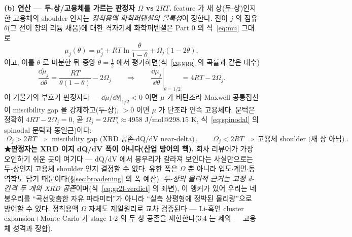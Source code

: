 \textbf{(b) 연산 --- 두-상/고용체를 가르는 판정자 $\Omega$ vs $2RT$.} feature 가 새 상(두-상)인지 한 고용체의
shoulder 인지는 \emph{정칙용액 화학퍼텐셜의 볼록성}이 정한다. 전이 $j$ 의 점유 $\theta$(그 전이 창의 리튬 채움)에
대한 격자기체 화학퍼텐셜은 Part 0 의 식~\eqref{eq:mu} 그대로
\begin{equation}
\mu_j(\theta)=\mu_j^{\circ}+RT\ln\frac{\theta}{1-\theta}+\Omega_j(1-2\theta),
\label{eq:gr2l-mu}
\end{equation}
이고, 이를 $\theta$ 로 미분한 뒤 중앙 $\theta=\tfrac12$ 에서 평가하면(식~\eqref{eq:gpp} 의 곡률과 같은 대수)
\begin{equation}
\frac{\dd\mu_j}{\dd\theta}=\frac{RT}{\theta(1-\theta)}-2\Omega_j
\qquad\Longrightarrow\qquad
\left.\frac{\dd\mu_j}{\dd\theta}\right|_{\theta=1/2}=4RT-2\Omega_j.
\label{eq:gr2l-dmu}
\end{equation}
이 기울기의 부호가 판정자다 --- $\dd\mu/\dd\theta|_{1/2}<0$ 이면 $\mu$ 가 비단조라 Maxwell 공통접선이
miscibility gap 을 강제하고(두-상), $>0$ 이면 $\mu$ 가 단조라 연속 고용체다. 문턱은 정확히
$4RT-2\Omega_j=0$, 곧 $\Omega_j=2RT$($\approx4958$ J/mol@$298.15$ K, 식~\eqref{eq:spinodal} 의 spinodal 문턱과
동일근)이다:
\begin{equation}
\boxed{\;
\Omega_j>2RT\ \Rightarrow\ \text{miscibility gap (XRD 공존$\cdot$dQ/dV near-delta)},\qquad
\Omega_j<2RT\ \Rightarrow\ \text{고용체 shoulder (새 상 아님)}\;.}
\label{eq:gr2l-verdict}
\end{equation}
\textbf{★판정자는 XRD 이지 dQ/dV 폭이 아니다(산업 방어의 핵).} 회사 리뷰어가 가장 오인하기 쉬운 곳이 여기다 ---
dQ/dV 에서 봉우리가 갈라져 보인다는 사실만으로는 두-상인지 고용체 shoulder 인지 결정할 수 없다. 유한 폭은
$\Omega$ 뿐 아니라 입도$\cdot$계면$\cdot$동역학도 담기 때문이다(\S\ref{sec:broadening} 의 폭 예산). \emph{두-상의 물리적
근거는 고정 d-간격 두 개의 XRD 공존}이며(식~\eqref{eq:gr2l-verdict} 의 좌변), 이 앵커가 있어 우리는 네 봉우리를
``곡선맞춤한 자유 파라미터''가 아니라 ``실측 상평형에 정박된 물리량''으로 방어할 수 있다. 정칙용액 $\Omega$
자체도 제일원리로 교차 검증된다 --- Li-흑연 cluster expansion$+$Monte-Carlo 가 stage 1$\cdot$2 의 두-상 공존을
재현한다\cite{persson2010,persson2010b}(3$\cdot$4 는 제외 --- 고용체 성격과 정합).

